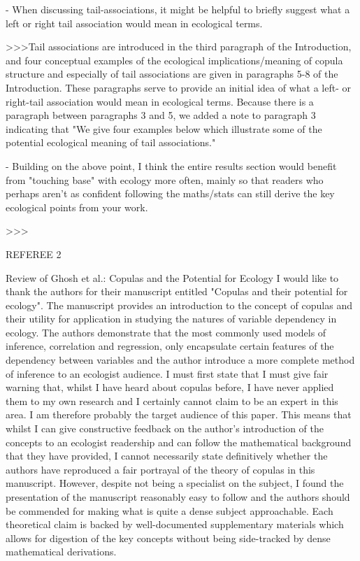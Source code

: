 - When discussing tail-associations, it might be helpful to briefly suggest what a left or right tail association would mean in ecological terms.

>>>Tail associations are introduced in the third paragraph of the Introduction, and four 
conceptual examples of the ecological implications/meaning of copula structure and especially 
of tail associations are given in paragraphs 5-8 of the Introduction. These paragraphs 
serve to provide an initial idea of what a left- or right-tail association would mean 
in ecological terms. Because there is a paragraph between paragraphs 3 and 5, we added 
a note to paragraph 3 indicating that "We give four examples below which illustrate some of the 
potential ecological meaning of tail associations."

- Building on the above point, I think the entire results section would benefit from "touching base" with ecology more often, mainly so that readers who perhaps aren't as confident following the maths/stats can still derive the key ecological points from your work.

>>>


REFEREE 2

Review of Ghosh et al.: Copulas and the Potential for Ecology
I would like to thank the authors for their manuscript entitled "Copulas and their potential for ecology".  The manuscript provides an introduction to the concept of copulas and their utility for application in studying the natures of variable dependency in ecology.  The authors demonstrate that the most commonly used models of inference, correlation and regression, only encapsulate certain features of the dependency between variables and the author introduce a more complete method of inference to an ecologist audience.
I must first state that I must give fair warning that, whilst I have heard about copulas before, I have never applied them to my own research and I certainly cannot claim to be an expert in this area.  I am therefore probably the target audience of this paper.  This means that whilst I can give constructive feedback on the author's introduction of the concepts to an ecologist readership and can follow the mathematical background that they have provided, I cannot necessarily state definitively whether the authors have reproduced a fair portrayal of the theory of copulas in this manuscript.
However, despite not being a specialist on the subject, I found the presentation of the manuscript reasonably easy to follow and the authors should be commended for making what is quite a dense subject approachable.  Each theoretical claim is backed by well-documented supplementary materials which allows for digestion of the key concepts without being side-tracked by dense mathematical derivations.

